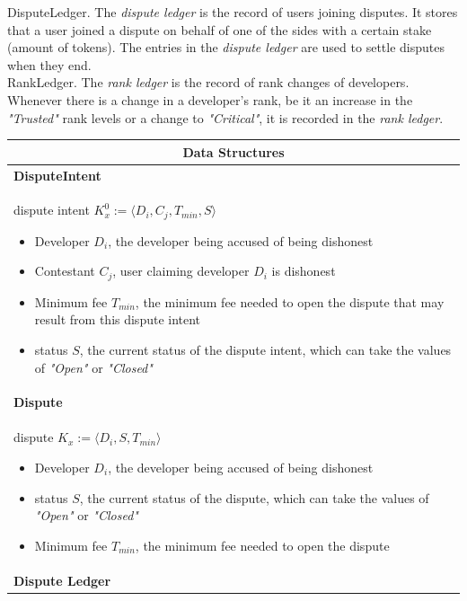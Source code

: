 \noindent \textsf{DisputeLedger}. The \textit{dispute ledger} is the record of users joining disputes. It stores that a user joined a dispute on behalf of one of the sides with a certain stake (amount of tokens). The entries in the \textit{dispute ledger} are used to settle disputes when they end. \\

\noindent \textsf{RankLedger}. The \textit{rank ledger} is the record of rank changes of developers. Whenever there is a change in a developer's rank, be it an increase in the \textit{"Trusted"} rank levels or a change to \textit{"Critical"}, it is recorded in the \textit{rank ledger}.

\begin{table}[H]
\footnotesize
\centering
\begin{tabular}{|p{}|}
\hline
\multicolumn{1}{|c|}{Data Structures} \\
\hline \vspace{0.05cm}
\textbf{DisputeIntent} \\
dispute intent $K^{0}_{x} := \langle D_i, C_j, T_{min}, S\rangle$
\begin{itemize}
	\item Developer $D_i$, the developer being accused of being dishonest
	\item Contestant $C_j$, user claiming developer $D_i$ is dishonest
	\item Minimum fee $T_{min}$, the minimum fee needed to open the dispute that may result from this dispute intent
	\item status $S$, the current status of the dispute intent, which can take the values of \textit{"Open"} or \textit{"Closed"}
\end{itemize} \\
\textbf{Dispute} \\
dispute $K_x := \langle D_i, S, T_{min}\rangle$
\begin{itemize}
	\item Developer $D_i$, the developer being accused of being dishonest
	\item status $S$, the current status of the dispute, which can take the values of \textit{"Open"} or \textit{"Closed"}
	\item Minimum fee $T_{min}$, the minimum fee needed to open the dispute
\end{itemize} \\
\textbf{Dispute Ledger} \\

\end{tabular}
\end{table}
